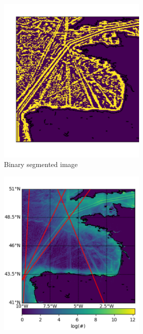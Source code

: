 \documentclass{article}
\begin{document}
\begin{figure}[h]
\begin{subfigure}[b]{0.5\linewidth}
    \includegraphics[width=0.8\textwidth]{CELTICopened-crop.pdf} 
    \caption{Binary segmented image} 
    \label{fig7:b} 
    \vspace{4ex}
  \end{subfigure} 
  \begin{subfigure}[b]{0.5\linewidth}
    \centering
    \includegraphics[width=0.8\textwidth]{CELTIClines-crop.pdf} 

\end{subfigure}
\end{figure}
\end{document}
